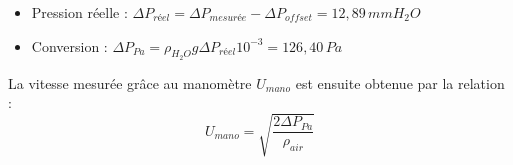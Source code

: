 \documentclass[12pt, a4paper]{report}
\begin{document}
	\begin{itemize}
		\item Pression réelle : $\Delta P_{réel} = \Delta P_{mesurée} - \Delta P_{offset} = 12,89 \, mmH_2O$
		\item Conversion : $\Delta P_{Pa} = \rho_{H_2O} g \Delta P_{réel} 10^{-3} = 126,40 \, Pa$
	\end{itemize}
	
	La vitesse mesurée grâce au manomètre $U_{mano}$ est ensuite obtenue par la relation :
	\begin{equation*}
		\boxed{U_{mano} = \sqrt{\frac{2 \Delta P_{Pa}}{\rho_{air}}}}
	\end{equation*}
	
	
\end{document}
